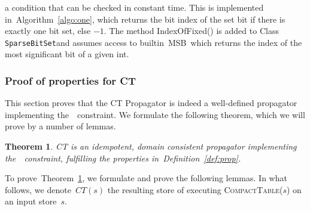 \documentclass[a4paper,11pt]{article}
\newtheorem{theorem}{Theorem}[section]
\newcommand{\Algoref}[1]{Algorithm~\ref{#1}}
\newcommand{\Table}{\Constraint{Table}}
\newcommand{\Defref}[1]{Definition~\ref{#1}}
\newcommand{\Thmref}[1]{Theorem~\ref{#1}}
\newcommand{\SparseBitSet}{\texttt{SparseBitSet}}
\def\CompactTable{\textsc{CompactTable}}
\def\FixDomains{\textsc{FixDomains}}
\numberwithin{equation}{section}
\begin{document}
\begin{description}
\noindent
a condition that can be checked in constant time.
This is implemented in~\Algoref{algo:one}, which returns
the bit index of the set bit if there is exactly one bit set, else $-1$.
The method IndexOfFixed() is added to Class \SparseBitSet and assumes access to
builtin~\textsc{MSB}~which returns the index of the most significant bit of a given int.

\begin{algorithm}[H]
  \begin{algorithmic}[1]  %
    
  \end{algorithmic}
  \caption{Checking if exactly one bit is set in \SparseBitSet.}
  \label{algo:one}
\end{algorithm}

\end{description}

%     

\subsubsection{Proof of properties for CT}
\label{sec:proof}

This section proves that the CT Propagator is indeed a well-defined propagator
implementing the~\Table~constraint. We formulate the following theorem, which
we will prove by a number of lemmas.

\begin{theorem} \label{thm:prop}
  CT is an idempotent, domain consistent propagator implementing 
  the~\Table~constraint, fulfilling the properties in~\Defref{def:prop}.
\end{theorem}

To prove~\Thmref{thm:prop}, we formulate and prove the following lemmas.
In what follows, we denote~$CT(s)$ the resulting store of executing
\CompactTable($s$) on an input store~$s$.
\end{document}
